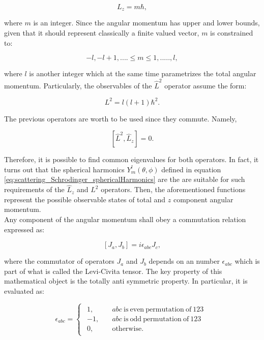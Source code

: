 \documentclass[openany]{book}
\begin{document}
\begin{equation} \label{eq:angularMomentum_Lz}
	L_z = m\hbar, 
\end{equation}

where $m$ is an integer. Since the angular momentum has upper and lower bounds, given that it should represent classically a finite valued vector, $m$ is constrained to: 

\begin{equation} \label{eq:angularMomentum_mConstraint}
	-l, -l + 1, .... \leq m \leq 1, ....., l,
\end{equation}

where $l$ is another integer which at the same time parametrizes the total angular momentum. Particularly, the observables of the $\hat L^2$ operator assume the form:

\begin{equation} \label{eq:angularMomentum_L2}
	L^2 = l(l+1)\hbar^2. 
\end{equation}

The previous operators are worth to be used since they commute. Namely, 

\begin{equation} \label{eq:angularMomentum_commutator}
	[\hat L^2, \hat L_z] = 0.
\end{equation}

Therefore, it is possible to find common eigenvalues for both operators. In fact, it turns out that the spherical harmonics $Y^{l}_m(\theta, \phi)$ defined in equation \ref{eq:scattering_Schrodinger_sphericalHarmonics} are the are suitable for such requirements of the $\hat L_z$ and $L^2$ operators. Then, the aforementioned functions represent the possible observable states of total and $z$ component angular momentum.  \\

Any component of the angular momentum shall obey a commutation relation expressed as: 

\begin{equation} \label{eq:angularMomentum_conmutation}
	[J_a, J_b]  = i \epsilon_{abc} J_c,
\end{equation}

where the commutator of operators $J_a$ and $J_b$ depends on an number $\epsilon_{abc}$ which is part of what is called the Levi-Civita tensor. The key property of this mathematical object is the totally anti symmetric property. In particular, it is evaluated as:

\begin{equation} \label{eq:angularMomentum_LeviCivitaTensor}
	\epsilon_{abc} = 	\left\{\begin{array}{l}
		\begin{split}
			1, \quad &abc\mathrm{\ is \ even \ permutation \ of \ 123} \\ 
			-1, \quad &abc\mathrm{\ is \ odd \ permutation \ of \ 123} \\
			0,	\quad &\mathrm{otherwise.}
		\end{split}
	\end{array}\right.
\end{equation}
\end{document}
